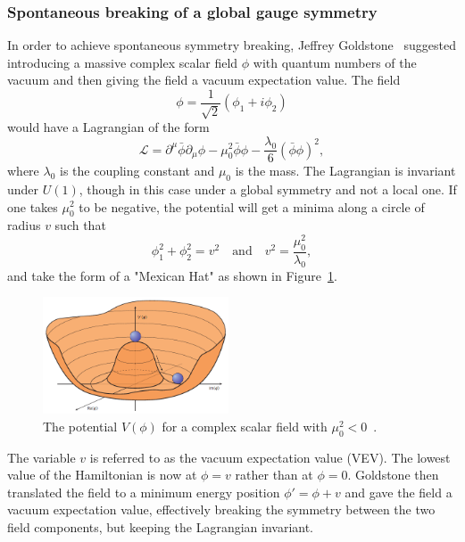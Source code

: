 \subsubsection{Spontaneous breaking of a global gauge symmetry}
In order to achieve spontaneous symmetry breaking, Jeffrey Goldstone~\cite{Goldstone:1961eq} suggested introducing a massive complex scalar field $\phi$ with quantum numbers of the vacuum and then giving the field a vacuum expectation value. The field
\begin{equation}
\phi = \frac{1}{\sqrt{2}}(\phi_1+i\phi_2)  
\end{equation}
would have a Lagrangian of the form
\begin{equation}
\mathcal{L} = \partial^{\mu}\bar{\phi}\partial_{\mu}\phi-\mu_0^2\bar{\phi}\phi-\frac{\lambda_0}{6}(\bar{\phi}\phi)^2,
\end{equation}
where $\lambda_0$ is the coupling constant and $\mu_0$ is the mass. The Lagrangian is invariant under $U(1)$, though in this case under a global symmetry and not a local one. If one takes $\mu_0^2$ to be negative, the potential will get a minima along a circle of radius $v$ such that
\begin{equation}
  \phi_1^2+\phi_2^2 = v^2 \quad \textrm{and}\quad v^2=\frac{\mu_0^2}{\lambda_0},
\end{equation}
and take the form of a "Mexican Hat" as shown in Figure~\ref{fig:theory:higgspot}. 
  \begin{figure}[h!]
  \centering
  \includegraphics[width=0.49\textwidth]{figures/theory/higgspotential.png}
  \caption{The potential $V(\phi)$ for a complex scalar field with $\mu_0^2<0$~\cite{Ellis:1638469}.}
  \label{fig:theory:higgspot}
  \end{figure}
The variable $v$ is referred to as the vacuum expectation value (VEV). The lowest value of the Hamiltonian is now at $\phi=v$ rather than at $\phi=0$. Goldstone then translated the field to a minimum energy position $\phi'=\phi+v$ and gave the field a vacuum expectation value, effectively breaking the symmetry between the two field components, but keeping the Lagrangian invariant.
